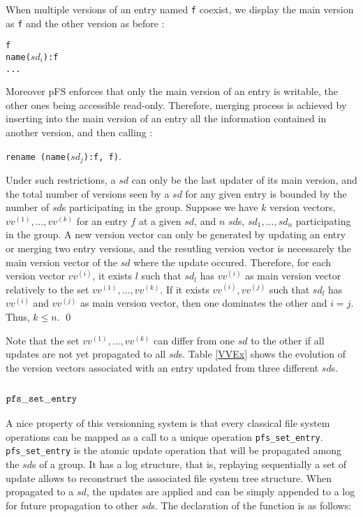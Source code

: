 When multiple versions of an entry named {\tt f} coexist, we display
the main version as {\tt f} and the other version as before :
\begin{center}
  {\tt f} \\
  {\tt name($sd_{i}$):f} \\
  {\tt ...}
\end{center}
Moreover pFS enforces that only the main version of an entry is
writable, the other ones being accessible read-only.
Therefore, merging process is achieved by inserting into the main
version of an entry all the information contained in another version,
and then calling :
\begin{center}
{\tt rename (name($sd_{j}$):f, f)}.
\end{center}
Under such restrictions, a $sd$ can only be the last updater of its
main version, and the total number of versions seen by a $sd$ for any
given entry is bounded by the number of $sd$s participating in the group.
{\proof
Suppose we have $k$ version vectors, $vv^{(1)},..., vv^{(k)}$ for an
entry $f$ at a given $sd$, and $n$ $sd$s, $sd_{1}, ..., sd_{n}$
participating in the group. A new version vector can only be generated
by updating an entry or merging two entry versions, and the resutling
version vector is necessarely the main version vector of the $sd$
where the update occured. Therefore, for each version vector
$vv^{(i)}$, it exists $l$ such that $sd_{l}$ has $vv^{(i)}$ as main
version vector relatively to the set $vv^{(1)},..., vv^{(k)}$. If it
exists $vv^{(i)},vv^{(j)}$ such that $sd_{l}$ has $vv^{(i)}$ and
$vv^{(j)}$ as main version vector, then one dominates the other and
$i=j$. Thus, $k \leq n$. \qed
}

Note that the set $vv^{(1)},..., vv^{(k)}$ can differ from one $sd$ to
the other if all updates are not yet propagated to all $sd$s. Table \ref{VVEx}
shows the evolution of the version vectors associated with an
entry updated from three different $sd$s.

\subsection {${\tt pfs\_set\_entry}$}
\label{sec:pfssetentry}

A nice property of this versionning system is that every classical
file system operations can be mapped as a call to a unique
operation {\tt pfs\_set\_entry}. {\tt pfs\_set\_entry} is the atomic
update operation that will be propagated among the $sd$s of a group.
It has a log structure, that is, replaying sequentially a set of update
allows to reconstruct the associated file system tree structure. When
propagated to a $sd$, the updates are applied and can be simply appended to a
log for future propagation to other $sd$s.  
The declaration of the function is as follows:

